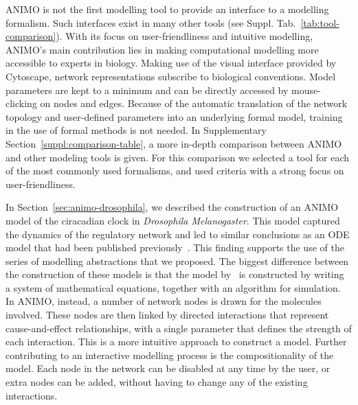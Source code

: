 \documentclass{bmcart}
\begin{document}
ANIMO is not the first modelling tool to provide an interface to a
modelling formalism. Such interfaces exist in many other tools (see Suppl. Tab.~\ref{tab:tool-comparison}). With its
focus on user-friendliness and intuitive modelling, ANIMO's main contribution lies 
in making computational modelling more accessible to experts in biology.
Making use of the visual
interface provided by Cytoscape, network representations subscribe to biological conventions. 
Model parameters are kept to a minimum and can be directly accessed by mouse-clicking on 
nodes and edges. Because of the automatic translation of the network topology and 
user-defined parameters into an underlying formal model, training in the use of formal methods 
is not needed. In Supplementary Section~\ref{suppl:comparison-table}, a more in-depth
comparison between ANIMO and other modeling tools is given. For this comparison we selected a tool
for each of the most commonly used formalisms, and used criteria with a strong focus on 
user-friendliness.

In Section~\ref{sec:animo-drosophila}, we described the construction of an ANIMO
model of the ciracadian clock in \emph{Drosophila Melanogaster}. This model
captured the dynamics of the regulatory network and led to similar 
conclusions as an ODE model that had been
published previously~\cite{drosophila-ode-model}. This finding supports the use of
the series of modelling abstractions that we proposed. The biggest
difference between the construction of these models is that the model by~\cite{drosophila-ode-model}
is constructed by writing a system of mathematical equations, together
with an algorithm for simulation. In ANIMO, instead, a number of network
nodes is drawn for the molecules involved. 
These nodes are then linked by directed
interactions that represent cause-and-effect relationships, with a single parameter 
that defines the strength of each
interaction. This is a more intuitive approach to construct a model.
Further contributing to an interactive modelling process
is the compositionality of the model. Each node in the network
can be disabled at any time by the user, or extra nodes can be added,
without having to change any of the existing interactions.
\end{document}
